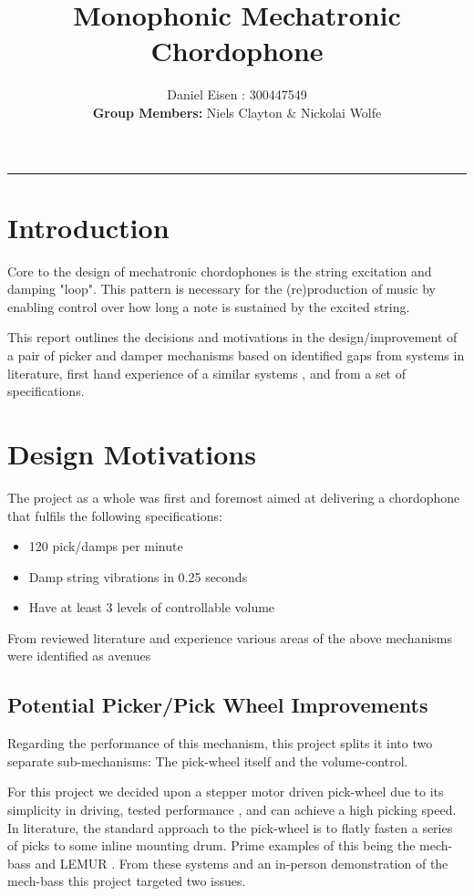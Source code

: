 \documentclass[a4paper,11pt]{article}
\begin{document}
\title{\LARGE{\textbf{Monophonic Mechatronic Chordophone}}}
\author{Daniel Eisen : 300447549\\\textbf{Group Members:} Niels Clayton \& Nickolai Wolfe}
\date{}
\maketitle
\hrule

\section{Introduction}
Core to the design of mechatronic chordophones is the string excitation and damping "loop". This pattern is necessary for the (re)production of music by enabling control over how long a note is sustained by the excited string. 

This report outlines the decisions and motivations in the design/improvement of a pair of picker and damper mechanisms based on identified gaps from systems in literature, first hand experience of a similar systems \cite{mechbass}, and from a set of specifications.

\section{Design Motivations}

The project as a whole was first and foremost aimed at delivering a chordophone that fulfils the following specifications:

\begin{itemize}
  \item 120 pick/damps per minute
  \item Damp string vibrations in 0.25 seconds
  \item Have at least 3 levels of controllable volume 
\end{itemize}

From reviewed literature and experience various areas of the above mechanisms were identified as avenues

\subsection{Potential Picker/Pick Wheel Improvements}
Regarding the performance of this mechanism, this project splits it into two separate sub-mechanisms: The pick-wheel itself and the volume-control.

For this project we decided upon a stepper motor driven pick-wheel due to its simplicity in driving, tested performance \cite{mechbass,singer,Kapur}, and can achieve a high picking speed. 
In literature, the standard approach to the pick-wheel is to flatly fasten a series of picks to some inline mounting drum. Prime examples of this being the mech-bass and LEMUR \cite{mechbass,singer}. From these systems and an in-person demonstration of the mech-bass this project targeted two issues.
\end{document}

